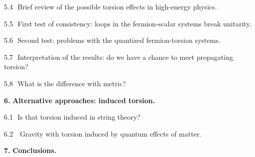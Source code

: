 \vskip 1mm \noindent
{5.4 $\,\,$Brief review of the possible torsion effects in  
high-energy physics.}

\vskip 1mm \noindent
{5.5 $\,\,$First test of consistency: loops in the fermion-scalar 
systems break unitarity.}

\vskip 1mm \noindent
{5.6 $\,\,$Second test: problems with the quantized
fermion-torsion systems.}

\vskip 1mm \noindent
{5.7 $\,\,$Interpretation of the results: do we have a chance to meet
propagating torsion?}

\vskip 1mm \noindent 
{5.8 $\,\,$What is the difference with metric?}

\vskip 3mm 
{\large\bf 6.$\,\,$Alternative approaches: induced torsion.}

\vskip 1mm \noindent
{6.1$\,\,$ Is that torsion induced in string theory?}

\vskip 1mm \noindent
{6.2 $\,\,$ Gravity with torsion induced by quantum effects 
of matter.}

\vskip 3mm  {\large\bf 7.$\,\,$Conclusions.} 
\newpage



